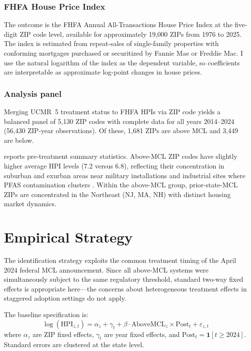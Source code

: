 \documentclass[12pt]{article}
\begin{document}
\subsubsection*{FHFA House Price Index} The outcome is the FHFA Annual All-Transactions House Price Index at the five-digit ZIP code level, available for approximately 19,000 ZIPs from 1976 to 2025. The index is estimated from repeat-sales of single-family properties with conforming mortgages purchased or securitized by Fannie Mae or Freddie Mac. I use the natural logarithm of the index as the dependent variable, so coefficients are interpretable as approximate log-point changes in house prices.

\subsubsection*{Analysis panel} Merging UCMR~5 treatment status to FHFA HPIs via ZIP code yields a balanced panel of 5,130 ZIP codes with complete data for all years 2014--2024 (56,430 ZIP-year observations). Of these, 1,681 ZIPs are above MCL and 3,449 are below.



 reports pre-treatment summary statistics. Above-MCL ZIP codes have slightly higher average HPI levels (7.2 versus 6.8), reflecting their concentration in suburban and exurban areas near military installations and industrial sites where PFAS contamination clusters \citep{Hu2021}. Within the above-MCL group, prior-state-MCL ZIPs are concentrated in the Northeast (NJ, MA, NH) with distinct housing market dynamics.

\section{Empirical Strategy}

The identification strategy exploits the common treatment timing of the April 2024 federal MCL announcement. Since all above-MCL systems were simultaneously subject to the same regulatory threshold, standard two-way fixed effects is appropriate here---the concerns about heterogeneous treatment effects in staggered adoption settings \citep{GoodmanBacon2021, deChaisemartin2020, CallawayStAntAnna2021} do not apply.

The baseline specification is:
\begin{equation}
\log(\text{HPI}_{z,t}) = \alpha_z + \gamma_t + \beta \cdot \text{AboveMCL}_z \times \text{Post}_t + \varepsilon_{z,t}
\label{eq:did}
\end{equation}
where $\alpha_z$ are ZIP fixed effects, $\gamma_t$ are year fixed effects, and $\text{Post}_t = \mathbf{1}[t \geq 2024]$. Standard errors are clustered at the state level.
\end{document}
